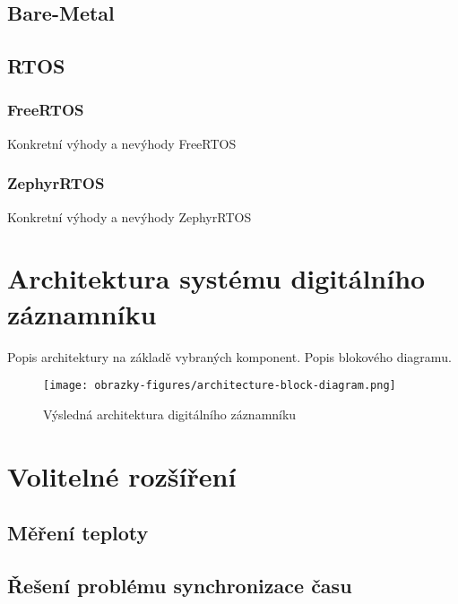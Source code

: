 \subsection{Bare-Metal}

\subsection{RTOS}
\subsubsection{FreeRTOS}
Konkretní výhody a nevýhody FreeRTOS

\subsubsection{ZephyrRTOS}
Konkretní výhody a nevýhody ZephyrRTOS


\section{Architektura systému digitálního záznamníku}
Popis architektury na základě vybraných komponent. Popis blokového diagramu.

\begin{figure}[h]
    \centering
    \texttt{[image: obrazky-figures/architecture-block-diagram.png]}
    
    \caption{Výsledná architektura digitálního záznamníku}
    \label{fig:low-power-modes}
\end{figure}


\section{Volitelné rozšíření}
\subsection{Měření teploty}


\subsection{Řešení problému synchronizace času}

